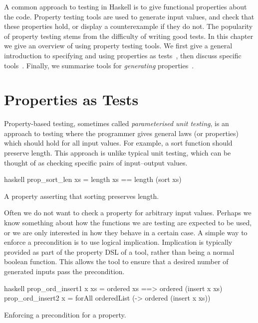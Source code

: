 A common approach to testing in Haskell is to give functional
properties about the code.  Property testing tools are used to
generate input values, and check that these properties hold, or
display a counterexample if they do not.  The popularity of property
testing stems from the difficulty of writing good tests.  In this
chapter we give an overview of using property testing tools.  We first
give a general introduction to specifying and using properties as
tests~, then discuss specific
tools~.  Finally, we summarise tools for
\emph{generating} properties~.

\section{Properties as Tests}
\label{sec:property_testing-intro}

Property-based testing\cite{claessen2000}, sometimes called
\emph{parameterised unit testing}, is an approach to testing where the
programmer gives general laws (or properties) which should hold for
all input values.  For example, a sort function should preserve
length.  This approach is unlike typical unit testing, which can be
thought of as checking specific pairs of input--output values.

\begin{listing}
\centering
\begin{cminted}{haskell}
prop_sort_len xs = length xs == length (sort xs)
\end{cminted}
\caption{A property asserting that sorting preserves length.}\label{lst:prop_sort_len}
\end{listing}

Often we do not want to check a property for arbitrary input values.
Perhaps we know something about how the functions we are testing are
expected to be used, or we are only interested in how they behave in a
certain case.  A simple way to enforce a precondition is to use
logical implication.  Implication is typically provided as part of the
property DSL of a tool, rather than being a normal boolean function.
This allows the tool to ensure that a desired number of generated
inputs pass the precondition.

\begin{listing}
\centering
\begin{cminted}{haskell}
prop_ord_insert1 x xs = ordered xs ==> ordered (insert x xs)
prop_ord_insert2 x    = forAll orderedList (\xs -> ordered (insert x xs))
\end{cminted}
\caption{Enforcing a precondition for a property.}\label{lst:prop_ord_insert}
\end{listing}

